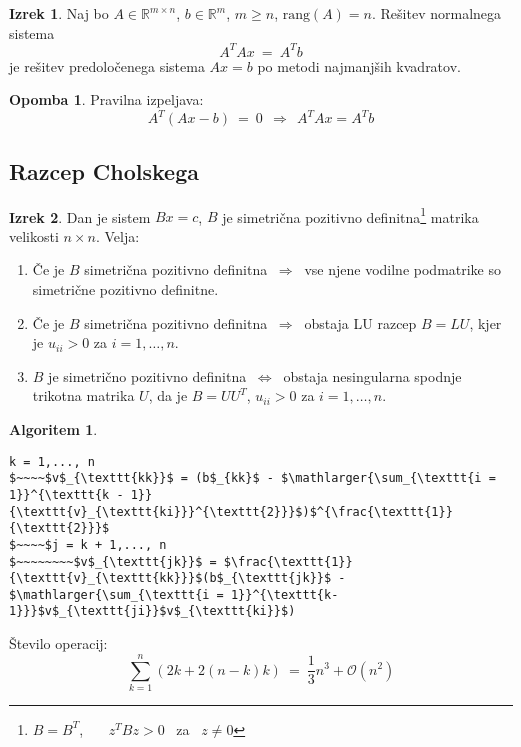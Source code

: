 \documentclass[11pt]{article}
\theoremstyle{definition}
\newtheorem{izrek}{Izrek}
\newtheorem*{algoritem}{Algoritem}
\newtheorem*{opomba}{Opomba}
\begin{document}
\begin{izrek}

Naj bo $A \in \mathbb{R}^{m \times n}$, $b \in \mathbb{R}^m$, $m \geq n$, $\text{rang}(A) = n$. Rešitev normalnega sistema
$$A^T A x ~=~ A^T b$$
je rešitev predoločenega sistema $Ax = b$ po metodi najmanjših kvadratov.

\end{izrek}
\vspace{0.5cm}

\begin{opomba}

Pravilna izpeljava:
$$A^T(Ax-b) ~=~ 0 ~~\Rightarrow~~ A^T A x = A^T b$$

\end{opomba}
\vspace{0.5cm}


\subsection{Razcep Cholskega}
\vspace{0.5cm}

\begin{izrek}

Dan je sistem $Bx = c$, $B$ je simetrična pozitivno definitna\footnote{$B = B^T$, ~~~$z^T B z > 0$ ~za~ $z \neq 0$} matrika velikosti $n \times n$. Velja:
\begin{enumerate}

	\item Če je $B$ simetrična pozitivno definitna $~\Rightarrow~$ vse njene vodilne podmatrike so simetrične pozitivno definitne.
	
	\item Če je $B$ simetrična pozitivno definitna $~\Rightarrow~$ obstaja LU razcep $B = LU$, kjer je $u_{ii} > 0$ za $i = 1, \ldots, n$.
	
	\item $B$ je simetrično pozitivno definitna $~\Leftrightarrow~$ obstaja nesingularna spodnje trikotna matrika $U$, da je $B = U U^T$, $u_{ii} > 0$ za $i = 1, \ldots, n$.

\end{enumerate}

\end{izrek}
\vspace{0.5cm}

\begin{algoritem}
~
\begin{lstlisting}
k = 1,..., n
$~~~~$v$_{\texttt{kk}}$ = (b$_{kk}$ - $\mathlarger{\sum_{\texttt{i = 1}}^{\texttt{k - 1}}{\texttt{v}_{\texttt{ki}}}^{\texttt{2}}}$)$^{\frac{\texttt{1}}{\texttt{2}}}$
$~~~~$j = k + 1,..., n 
$~~~~~~~~$v$_{\texttt{jk}}$ = $\frac{\texttt{1}}{\texttt{v}_{\texttt{kk}}}$(b$_{\texttt{jk}}$ - $\mathlarger{\sum_{\texttt{i = 1}}^{\texttt{k-1}}}$v$_{\texttt{ji}}$v$_{\texttt{ki}}$)
\end{lstlisting}
Število operacij:
$$\sum_{k=1}^n \left( 2k + 2(n-k)k \right) ~=~ \frac{1}{3}n^3 + \mathcal{O}(n^2)$$
\end{algoritem}
\vspace{0.5cm}
\end{document}
